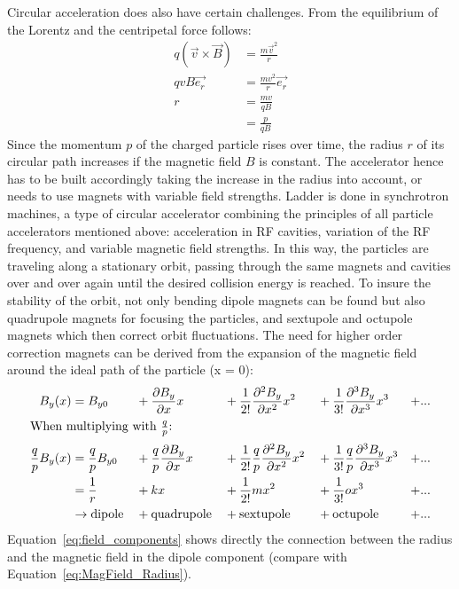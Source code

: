 Circular acceleration does also have certain challenges.
From the equilibrium of the Lorentz and the centripetal force follows:
\begin{align}
q(\vec{v}\times \vec{B}) &= \frac{m\vec{v}^2}{r}\\
qvB\vec{e_r} &= \frac{mv^2}{r}\vec{e_r} \nonumber \\
 r&=\frac{mv}{qB}\\
 &=\frac{p}{qB}\label{eq:MagField_Radius}
\end{align}
Since the momentum $p$ of the charged particle rises over time, the radius $r$ of its circular path increases if the magnetic field $B$ is constant.
The accelerator hence has to be built accordingly taking the increase in the radius into account, or needs to use magnets with variable field strengths.
Ladder is done in synchrotron machines, a type of circular accelerator combining the principles of all particle accelerators mentioned above: acceleration in RF cavities, variation of the RF frequency, and variable magnetic field strengths.
In this way, the particles are traveling along a stationary orbit, passing through the same magnets and cavities over and over again until the desired collision energy is reached.
To insure the stability of the orbit, not only bending dipole magnets can be found but also quadrupole magnets for focusing the particles, and sextupole and octupole magnets which then correct orbit fluctuations.
The need for higher order correction magnets can be derived from the expansion of the magnetic field around the ideal path of the particle (x = 0):
\begin{alignat}{5}
 B_y(x) &= B_{y0} &&+ \frac{\partial B_y}{\partial x}x &&+ \frac{1}{2!}\frac{\partial^2 B_y}{\partial x^2}x^2 &&+ \frac{1}{3!}\frac{\partial^3 B_y}{\partial x^3}x^3 &+ ...\\
 \intertext{When multiplying with $\frac{q}{p}$:}
 \frac{q}{p}B_y(x) &= \frac{q}{p}B_{y0} &&+ \frac{q}{p}\frac{\partial B_y}{\partial x}x &&+  \frac{1}{2!}\frac{q}{p}\frac{\partial^2 B_y}{\partial x^2}x^2 &&+ \frac{1}{3!}\frac{q}{p}\frac{\partial^3 B_y}{\partial x^3}x^3 &+ ...\\
  &= \frac{1}{r} &&+ kx &&+ \frac{1}{2!}mx^2 &&+ \frac{1}{3!}ox^3 &+ ... \label{eq:field_components}\\
  &\rightarrow \textnormal{dipole} &&+ \textnormal{quadrupole} &&+ \textnormal{sextupole} &&+ \textnormal{octupole} &+ ...\nonumber
\end{alignat}
Equation~\ref{eq:field_components} shows directly the connection between the radius and the magnetic field in the dipole component (compare with Equation~\ref{eq:MagField_Radius}).
